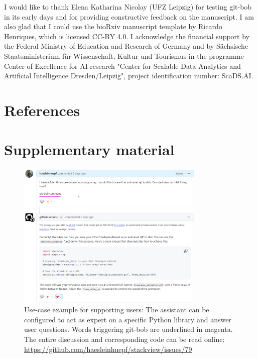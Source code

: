 \documentclass[times, twoside]{zHenriquesLab-StyleBioRxiv}
\begin{document}
\begin{acknowledgements}

I would like to thank Elena Katharina Nicolay (UFZ Leipzig) for testing git-bob in its early days and for providing constructive feedback on the manuscript. I am also glad that I could use the bioRxiv manuscript template by Ricardo Henriques, which is licensed CC-BY 4.0. I acknowledge the financial support by the Federal Ministry of Education and Research of Germany and by Sächsische Staatsministerium für Wissenschaft, Kultur und Tourismus in the programme Center of Excellence for AI-research "Center for Scalable Data Analytics and Artificial Intelligence Dresden/Leipzig", project identification number: ScaDS.AI.

\end{acknowledgements}

\section*{References}


\onecolumn
\newpage





\section*{Supplementary material}
\setcounter{figure}{0} 
\renewcommand{\thefigure}{S\arabic{figure}}

\begin{figure}[h]
\centering
\includegraphics[width=0.8\textwidth]{example_supporting_users.png}
\caption{Use-case example for supporting users: The assistant can be configured to act as expert on a specific Python library and answer user questions. Words triggering git-bob are underlined in magenta. The entire discussion and corresponding code can be read online: \url{https://github.com/haesleinhuepf/stackview/issues/79}
\newline
\newline
}
\label{fig:examplesupportingusers}
\end{figure}
\end{document}
